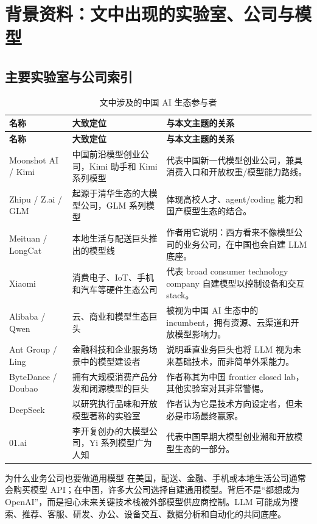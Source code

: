 \section{背景资料：文中出现的实验室、公司与模型}

\subsection{主要实验室与公司索引}

\begin{longtable}{@{}p{3.2cm}p{4.4cm}p{6.2cm}@{}}
\caption{文中涉及的中国 AI 生态参与者}\\
\toprule
\textbf{名称} & \textbf{大致定位} & \textbf{与本文主题的关系} \\
\midrule
\endfirsthead
\toprule
\textbf{名称} & \textbf{大致定位} & \textbf{与本文主题的关系} \\
\midrule
\endhead
Moonshot AI / Kimi & 中国前沿模型创业公司，Kimi 助手和 Kimi 系列模型 & 代表中国新一代模型创业公司，兼具消费入口和开放权重/模型能力路线。 \\
\addlinespace
Zhipu / Z.ai / GLM & 起源于清华生态的大模型公司，GLM 系列模型 & 体现高校人才、agent/coding 能力和国产模型生态的结合。 \\
\addlinespace
Meituan / LongCat & 本地生活与配送巨头推出的模型线 & 作者用它说明：西方看来不像模型公司的业务公司，在中国也会自建 LLM 底座。 \\
\addlinespace
Xiaomi & 消费电子、IoT、手机和汽车等硬件生态公司 & 代表 broad consumer technology company 自建模型以控制设备和交互 stack。 \\
\addlinespace
Alibaba / Qwen & 云、商业和模型生态巨头 & 被视为中国 AI 生态中的 incumbent，拥有资源、云渠道和开放模型影响力。 \\
\addlinespace
Ant Group / Ling & 金融科技和企业服务场景中的模型建设者 & 说明垂直业务巨头也将 LLM 视为未来基础技术，而非简单外采能力。 \\
\addlinespace
ByteDance / Doubao & 拥有大规模消费产品分发和闭源模型的巨头 & 作者称其为中国 frontier closed lab，其他实验室对其非常警惕。 \\
\addlinespace
DeepSeek & 以研究执行品味和开放模型著称的实验室 & 作者认为它是技术方向设定者，但未必是市场最终赢家。 \\
\addlinespace
01.ai & 李开复创办的大模型公司，Yi 系列模型广为人知 & 代表中国早期大模型创业潮和开放模型生态的一部分。 \\
\bottomrule
\end{longtable}

\begin{knowledgebox}{为什么业务公司也要做通用模型}
在美国，配送、金融、手机或本地生活公司通常会购买模型 API；在中国，许多大公司选择自建通用模型。背后不是``都想成为 OpenAI''，而是担心未来关键技术栈被外部模型供应商控制。LLM 可能成为搜索、推荐、客服、研发、办公、设备交互、数据分析和自动化的共同底座。
\end{knowledgebox}

